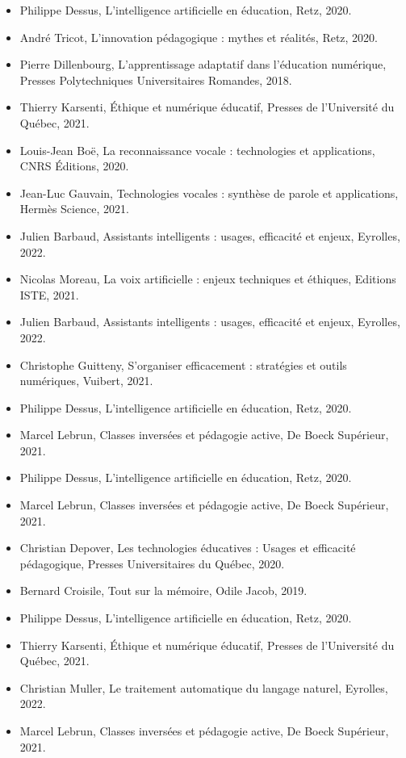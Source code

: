 \documentclass[12pt,a4paper]{report}
\begin{document}
\begin{itemize}
    \item Philippe Dessus, L’intelligence artificielle en éducation, Retz, 2020.
    \item André Tricot, L’innovation pédagogique : mythes et réalités, Retz, 2020.
    \item Pierre Dillenbourg, L’apprentissage adaptatif dans l’éducation numérique, Presses Polytechniques Universitaires Romandes, 2018.
    \item Thierry Karsenti, Éthique et numérique éducatif, Presses de l’Université du Québec, 2021.
    
    \item Louis-Jean Boë, La reconnaissance vocale : technologies et applications, CNRS Éditions, 2020.
    \item Jean-Luc Gauvain, Technologies vocales : synthèse de parole et applications, Hermès Science, 2021.
    \item Julien Barbaud, Assistants intelligents : usages, efficacité et enjeux, Eyrolles, 2022.
    \item Nicolas Moreau, La voix artificielle : enjeux techniques et éthiques, Editions ISTE, 2021.
    
    \item Julien Barbaud, Assistants intelligents : usages, efficacité et enjeux, Eyrolles, 2022.
    \item Christophe Guitteny, S'organiser efficacement : stratégies et outils numériques, Vuibert, 2021.
    \item Philippe Dessus, L’intelligence artificielle en éducation, Retz, 2020.
    \item Marcel Lebrun, Classes inversées et pédagogie active, De Boeck Supérieur, 2021.
    
    \item Philippe Dessus, L'intelligence artificielle en éducation, Retz, 2020.
    \item Marcel Lebrun, Classes inversées et pédagogie active, De Boeck Supérieur, 2021.
    \item Christian Depover, Les technologies éducatives : Usages et efficacité pédagogique, Presses Universitaires du Québec, 2020.

    \item Bernard Croisile, Tout sur la mémoire, Odile Jacob, 2019.
    \item Philippe Dessus, L’intelligence artificielle en éducation, Retz, 2020.
    \item Thierry Karsenti, Éthique et numérique éducatif, Presses de l’Université du Québec, 2021.
    \item Christian Muller, Le traitement automatique du langage naturel, Eyrolles, 2022.
    \item Marcel Lebrun, Classes inversées et pédagogie active, De Boeck Supérieur, 2021.
    

\end{itemize}
\end{document}
